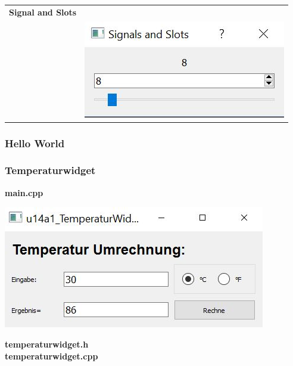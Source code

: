 \begin{longtable}{l l}
    \\
    \textbf{Signal and Slots}&\\
    &
    \hspace{-2cm}\includegraphics{images/qtSpezUeb3.jpg} 
\end{longtable}
\clearpage
\subsubsection{Hello World}


\subsubsection{Temperaturwidget}
\textbf{main.cpp}
\\
\begin{multicols}{2}


\includegraphics[width=\linewidth]{images/temperaturwidget}
\end{multicols}

\textbf{temperaturwidget.h}
\\

\newpage
\textbf{temperaturwidget.cpp}


